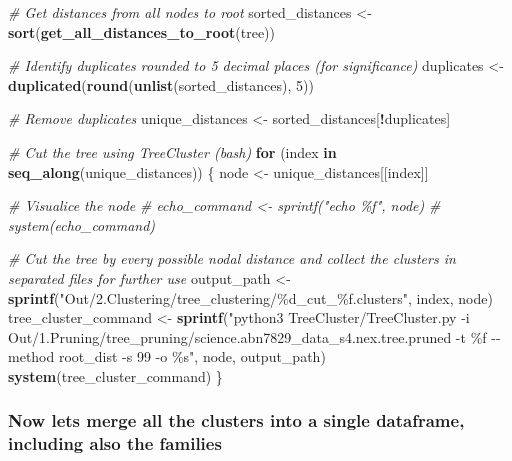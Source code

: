 \documentclass[
]{article}
\newenvironment{Shaded}{\begin{snugshade}}{\end{snugshade}}
\newcommand{\CommentTok}[1]{\textcolor[rgb]{0.56,0.35,0.01}{\textit{#1}}}
\newcommand{\ControlFlowTok}[1]{\textcolor[rgb]{0.13,0.29,0.53}{\textbf{#1}}}
\newcommand{\DecValTok}[1]{\textcolor[rgb]{0.00,0.00,0.81}{#1}}
\newcommand{\FunctionTok}[1]{\textcolor[rgb]{0.13,0.29,0.53}{\textbf{#1}}}
\newcommand{\NormalTok}[1]{#1}
\newcommand{\OtherTok}[1]{\textcolor[rgb]{0.56,0.35,0.01}{#1}}
\newcommand{\SpecialCharTok}[1]{\textcolor[rgb]{0.81,0.36,0.00}{\textbf{#1}}}
\newcommand{\StringTok}[1]{\textcolor[rgb]{0.31,0.60,0.02}{#1}}
\begin{document}
\begin{Shaded}
\begin{Highlighting}[]
\CommentTok{\# Get distances from all nodes to root}
\NormalTok{sorted\_distances }\OtherTok{\textless{}{-}} \FunctionTok{sort}\NormalTok{(}\FunctionTok{get\_all\_distances\_to\_root}\NormalTok{(tree))}

\CommentTok{\# Identify duplicates rounded to 5 decimal places (for significance)}
\NormalTok{duplicates }\OtherTok{\textless{}{-}} \FunctionTok{duplicated}\NormalTok{(}\FunctionTok{round}\NormalTok{(}\FunctionTok{unlist}\NormalTok{(sorted\_distances), }\DecValTok{5}\NormalTok{))}

\CommentTok{\# Remove duplicates}
\NormalTok{unique\_distances }\OtherTok{\textless{}{-}}\NormalTok{ sorted\_distances[}\SpecialCharTok{!}\NormalTok{duplicates]}

\CommentTok{\# Cut the tree using TreeCluster (bash)}
\ControlFlowTok{for}\NormalTok{ (index }\ControlFlowTok{in} \FunctionTok{seq\_along}\NormalTok{(unique\_distances)) \{}
\NormalTok{  node }\OtherTok{\textless{}{-}}\NormalTok{ unique\_distances[[index]]}
  
  \CommentTok{\# Visualice the node}
  \CommentTok{\# echo\_command \textless{}{-} sprintf("echo \%f", node)}
  \CommentTok{\# system(echo\_command)}
    
  \CommentTok{\# Cut the tree by every possible nodal distance and collect the clusters in separated files for further use}
\NormalTok{  output\_path }\OtherTok{\textless{}{-}} \FunctionTok{sprintf}\NormalTok{(}\StringTok{"Out/2.Clustering/tree\_clustering/\%d\_cut\_\%f.clusters"}\NormalTok{, index, node)}
\NormalTok{  tree\_cluster\_command }\OtherTok{\textless{}{-}} \FunctionTok{sprintf}\NormalTok{(}\StringTok{"python3 TreeCluster/TreeCluster.py {-}i Out/1.Pruning/tree\_pruning/science.abn7829\_data\_s4.nex.tree.pruned {-}t \%f {-}{-}method root\_dist {-}s 99 {-}o \%s"}\NormalTok{, node, output\_path)}
  \FunctionTok{system}\NormalTok{(tree\_cluster\_command)}
\NormalTok{\}}
\end{Highlighting}
\end{Shaded}

\hypertarget{now-lets-merge-all-the-clusters-into-a-single-dataframe-including-also-the-families}{%
\subsubsection{Now lets merge all the clusters into a single dataframe,
including also the
families}\label{now-lets-merge-all-the-clusters-into-a-single-dataframe-including-also-the-families}}
\end{document}
